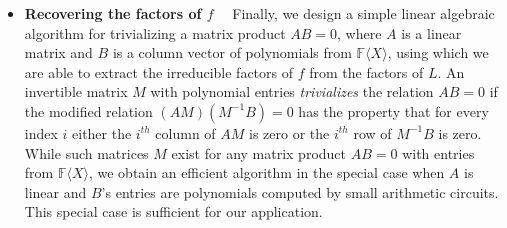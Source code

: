 \documentclass[10pt,a4paper]{article}
\newcommand{\F}{\mathbb{F}}
\renewcommand{\angle}[1]{\langle #1 \rangle}
\newcommand{\FX}{\F\angle{X}}
\begin{document}
\begin{itemize}
\item \textbf{Recovering the factors of $f$}~~ Finally, we design a
  simple linear algebraic algorithm for trivializing a matrix product
  $AB=0$, where $A$ is a linear matrix and $B$ is a column vector of
  polynomials from $\FX$, using which we are able to extract the
  irreducible factors of $f$ from the factors of $L$. An invertible
  matrix $M$ with polynomial entries \emph{trivializes} the relation
  $AB=0$ if the modified relation $(AM)(M^{-1}B)=0$ has the property
  that for every index $i$ either the $i^{th}$ column of $AM$ is zero
  or the $i^{th}$ row of $M^{-1}B$ is zero. While such matrices $M$
  exist for any matrix product $AB=0$ with entries from $\FX$, we
  obtain an efficient algorithm in the special case when $A$ is linear
  and $B$'s entries are polynomials computed by small arithmetic
  circuits. This special case is sufficient for our application.
\end{itemize}
\end{document}
